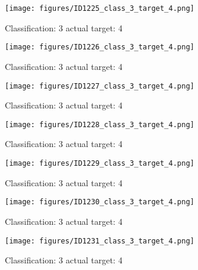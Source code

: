 \begin{figure}[h!]
\begin{center}
\texttt{[image: figures/ID1225\_class\_3\_target\_4.png]}
\end{center}
\caption{ Classification: 3 actual target: 4}
\label{fig:ID1225_class_3_target_4}
\end{figure}
\begin{figure}[h!]
\begin{center}
\texttt{[image: figures/ID1226\_class\_3\_target\_4.png]}
\end{center}
\caption{ Classification: 3 actual target: 4}
\label{fig:ID1226_class_3_target_4}
\end{figure}
\begin{figure}[h!]
\begin{center}
\texttt{[image: figures/ID1227\_class\_3\_target\_4.png]}
\end{center}
\caption{ Classification: 3 actual target: 4}
\label{fig:ID1227_class_3_target_4}
\end{figure}
\begin{figure}[h!]
\begin{center}
\texttt{[image: figures/ID1228\_class\_3\_target\_4.png]}
\end{center}
\caption{ Classification: 3 actual target: 4}
\label{fig:ID1228_class_3_target_4}
\end{figure}
\begin{figure}[h!]
\begin{center}
\texttt{[image: figures/ID1229\_class\_3\_target\_4.png]}
\end{center}
\caption{ Classification: 3 actual target: 4}
\label{fig:ID1229_class_3_target_4}
\end{figure}
\begin{figure}[h!]
\begin{center}
\texttt{[image: figures/ID1230\_class\_3\_target\_4.png]}
\end{center}
\caption{ Classification: 3 actual target: 4}
\label{fig:ID1230_class_3_target_4}
\end{figure}
\begin{figure}[h!]
\begin{center}
\texttt{[image: figures/ID1231\_class\_3\_target\_4.png]}
\end{center}
\caption{ Classification: 3 actual target: 4}
\label{fig:ID1231_class_3_target_4}
\end{figure}
